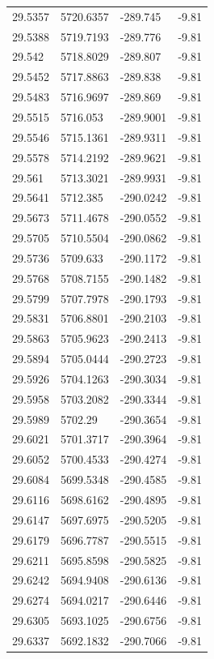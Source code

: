 \begin{table}[H]
\begin{tabular}{llll}
29.5357 & 5720.6357 & -289.745 & -9.81 \\
29.5388 & 5719.7193 & -289.776 & -9.81 \\
29.542 & 5718.8029 & -289.807 & -9.81 \\
29.5452 & 5717.8863 & -289.838 & -9.81 \\
29.5483 & 5716.9697 & -289.869 & -9.81 \\
29.5515 & 5716.053 & -289.9001 & -9.81 \\
29.5546 & 5715.1361 & -289.9311 & -9.81 \\
29.5578 & 5714.2192 & -289.9621 & -9.81 \\
29.561 & 5713.3021 & -289.9931 & -9.81 \\
29.5641 & 5712.385 & -290.0242 & -9.81 \\
29.5673 & 5711.4678 & -290.0552 & -9.81 \\
29.5705 & 5710.5504 & -290.0862 & -9.81 \\
29.5736 & 5709.633 & -290.1172 & -9.81 \\
29.5768 & 5708.7155 & -290.1482 & -9.81 \\
29.5799 & 5707.7978 & -290.1793 & -9.81 \\
29.5831 & 5706.8801 & -290.2103 & -9.81 \\
29.5863 & 5705.9623 & -290.2413 & -9.81 \\
29.5894 & 5705.0444 & -290.2723 & -9.81 \\
29.5926 & 5704.1263 & -290.3034 & -9.81 \\
29.5958 & 5703.2082 & -290.3344 & -9.81 \\
29.5989 & 5702.29 & -290.3654 & -9.81 \\
29.6021 & 5701.3717 & -290.3964 & -9.81 \\
29.6052 & 5700.4533 & -290.4274 & -9.81 \\
29.6084 & 5699.5348 & -290.4585 & -9.81 \\
29.6116 & 5698.6162 & -290.4895 & -9.81 \\
29.6147 & 5697.6975 & -290.5205 & -9.81 \\
29.6179 & 5696.7787 & -290.5515 & -9.81 \\
29.6211 & 5695.8598 & -290.5825 & -9.81 \\
29.6242 & 5694.9408 & -290.6136 & -9.81 \\
29.6274 & 5694.0217 & -290.6446 & -9.81 \\
29.6305 & 5693.1025 & -290.6756 & -9.81 \\
29.6337 & 5692.1832 & -290.7066 & -9.81 \\

\end{tabular}
\end{table}
